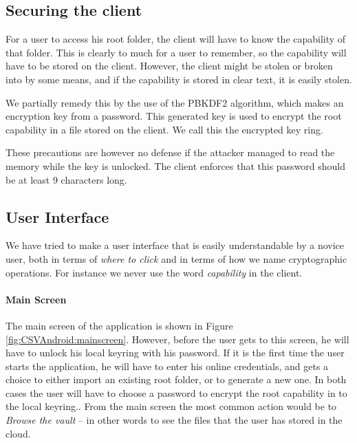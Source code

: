 \documentclass[pdftex,english,10pt,b5paper,twoside]{book}
\begin{document}
\subsection{Securing the client}

For a user to access his root folder, the client will have to know the
capability of that folder. This is clearly to much for a user to remember, so
the capability will have to be stored on the client. However, the client might
be stolen or broken into by some means, and if the capability is stored in clear
text, it is easily stolen. 

We partially remedy this by the use of the \ac{PBKDF2} algorithm, which makes an
encryption key from a password. This generated key is used to encrypt the root
capability in a file stored on the client. We call this the encrypted key ring.

These precautions are however no defense if the attacker managed to read the
memory while the key is unlocked. The client enforces that this password should
be at least 9 characters long. 

\subsection{User Interface}

We have tried to make a user interface that is easily understandable by a novice
user, both in terms of \emph{where to click} and in terms of how we name
cryptographic operations. For instance we never use the word \emph{capability}
in the client.

\paragraph{Main Screen}

The main screen of the application is shown in Figure
\ref{fig:CSVAndroid:mainscreen}. However, before the user gets to this screen,
he will have to unlock his local keyring with his password. If it is the first
time the user starts the application, he will have to enter his online
credentials, and gets a choice to either import an existing root folder, or to
generate a new one. In both cases the user will have to choose a password to
encrypt the root capability in to the local keyring.. From the main screen the
most common action would be to \emph{Browse the vault} -- in other words to see
the files that the user has stored in the cloud.
\end{document}
